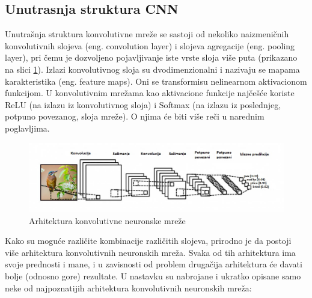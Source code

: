 \documentclass[a4paper]{article}
\begin{document}
\subsection{Unutrasnja struktura CNN}
\label{struktura_cnn}
Unutrašnja struktura konvolutivne mreže se sastoji od nekoliko naizmeničnih konvolutivnih slojeva (eng. convolution layer) i slojeva agregacije (eng. pooling layer), pri čemu je dozvoljeno pojavljivanje iste vrste sloja više puta (prikazano na slici \ref{fig:cnn_layers}). Izlazi konvolutivnog sloja su dvodimenzionalni i nazivaju se mapama karakteristika (eng. feature maps). Oni se transformisu nelinearnom aktivacionom funkcijom. U konvolutivnim mrežama kao aktivacione funkcije najčešće koriste ReLU (na izlazu iz konvolutivnog sloja) i Softmax (na izlazu iz poslednjeg, potpuno povezanog, sloja mreže). O njima će biti više reči u narednim poglavljima.


\begin{figure}[h!]
\begin{center}
\includegraphics[scale=0.62]{cnn_layers.jpg}
\end{center}
\caption{Arhitektura konvolutivne neuronske mreže}
\label{fig:cnn_layers}
\end{figure}

Kako su moguće različite kombinacije različitih slojeva, prirodno je da postoji više arhitektura konvolutivnih neuronskih mreža. Svaka od tih arhitektura ima svoje prednosti i mane, i u zavisnosti od problem drugačija arhitektura će davati bolje (odnosno gore) rezultate. U nastavku su nabrojane i ukratko opisane samo neke od najpoznatijih arhitektura konvolutivnih neuronskih mreža:
\end{document}
